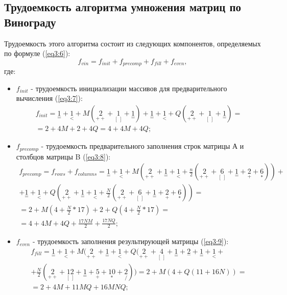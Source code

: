 \subsection{Трудоемкость алгоритма умножения матриц по Винограду}
Трудоемкость этого алгоритма состоит из следующих компонентов, определяемых по формуле (\ref{eq3:6}):
\begin{equation}
	\label{eq3:6}
	f_{vin} = f_{init} + f_{precomp} + f_{fill} + f_{even},
\end{equation}
где:
\begin{itemize}
	\item $f_{init}$ - трудоемкость инициализации массивов для предварительного вычисления (\ref{eq3:7}):
	\begin{multline}
		\label{eq3:7}
		f_{init} = {\underset{=}{1}} + {\underset{<}{1}} + M({\underset{++}{2}} + {\underset{[\ ]}{1}} + {\underset{=}{1}}) + {\underset{=}{1}} + {\underset{<}{1}} + Q({\underset{++}{2}} + {\underset{[\ ]}{1}} + {\underset{=}{1}}) = \\
		= 2 + 4M + 2 + 4Q = 4 + 4M + 4Q; 
	\end{multline}
	
	
	\item $f_{precomp}$ - трудоемкость предварительного заполнения строк матрицы А и столбцов матрицы B (\ref{eq3:8}):
	\begin{multline}
		\label{eq3:8}
		f_{precomp} = f_{rows} + f_{columns} = {\underset{=}{1}} + {\underset{<}{1}} + M({\underset{++}{2}} + {\underset{=}{1}} + {\underset{<}{1}} + \frac{n}{2}({\underset{++}{2}} + {\underset{[\ ]}{6}} + {\underset{=}{1}} + {\underset{+}{2}} + {\underset{*}{6}})) + \\
		+ {\underset{=}{1}} + {\underset{<}{1}} + Q({\underset{++}{2}} + {\underset{=}{1}} + {\underset{<}{1}} + \frac{N}{2}({\underset{++}{2}} + {\underset{[\ ]}{6}} + {\underset{=}{1}} + {\underset{+}{2}} + {\underset{*}{6}})) = \\
		= 2 + M(4 + \frac{N}{2} * 17) + 2 + Q(4 + \frac{N}{2} * 17) = \\
		= 4 + 4M + 4Q + \frac{17NM}{2} + \frac{17NQ}{2};
	\end{multline}
	
	
	\item $f_{even}$ - трудоемкость заполнения результирующей матрицы (\ref{eq3:9}):
	\begin{multline}
		\label{eq3:9}
		f_{fill} = {\underset{=}{1}} + {\underset{<}{1}} + M({\underset{++}{2}} + {\underset{=}{1}} + {\underset{<}{1}} + Q({\underset{++}{2}} + {\underset{[\ ]}{4}} + {\underset{=}{1}} + {\underset{-}{2}} + {\underset{=}{1}} + {\underset{<}{1}} +\\
		+ \frac{N}{2}({\underset{++}{2}} + {\underset{[\ ]}{12}} + {\underset{=}{1}} +
		{\underset{+}{5}} + {\underset{*}{10}} + {\underset{/}{2}})) = 2 + M(4 + Q(11 + 16N)) = \\
		= 2 + 4M + 11MQ + 16MNQ;
	\end{multline}
	

\end{itemize}
